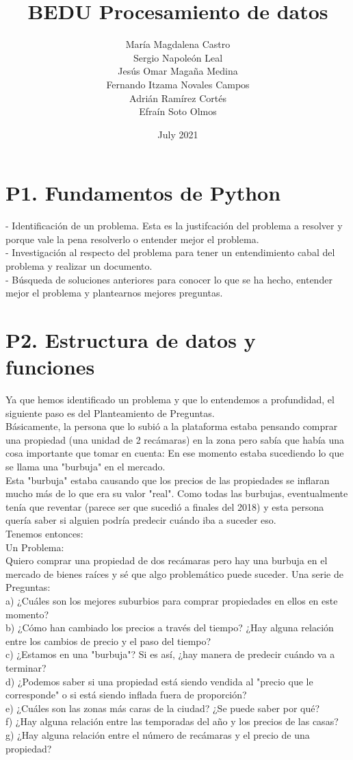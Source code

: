 \documentclass{article}
\title{BEDU Procesamiento de datos}
\author{María  Magdalena Castro\\
Sergio Napoleón Leal\\
Jesús Omar Magaña Medina\\
Fernando Itzama Novales Campos\\
Adrián Ramírez Cortés\\
Efraín Soto Olmos}
\date{July 2021}
\begin{document}
\maketitle
\section{P1. Fundamentos de Python}
- Identificación de un problema. Esta es la justifcación del problema a resolver y porque vale la pena resolverlo o entender mejor el problema.\\
- Investigación al respecto del problema para tener un entendimiento cabal del problema y realizar un documento. \\
- Búsqueda de soluciones anteriores para conocer lo que se ha hecho, entender mejor el problema y plantearnos mejores preguntas. 
\section{P2. Estructura de datos y funciones}
Ya que hemos identificado un problema y que lo entendemos a profundidad, el siguiente paso es del Planteamiento de Preguntas.\\
Básicamente, la persona que lo subió a la plataforma estaba pensando comprar una propiedad (una unidad de 2 recámaras) en la zona pero sabía que había una cosa importante que tomar en cuenta: En ese momento estaba sucediendo lo que se llama una "burbuja" en el mercado.\\
Esta "burbuja" estaba causando que los precios de las propiedades se inflaran mucho más de lo que era su valor "real". Como todas las burbujas, eventualmente tenía que reventar (parece ser que sucedió a finales del 2018) y esta persona quería saber si alguien podría predecir cuándo iba a suceder eso.\\
Tenemos entonces:\\
Un Problema:\\
Quiero comprar una propiedad de dos recámaras pero hay una burbuja en el mercado de bienes raíces y sé que algo problemático puede suceder.
Una serie de Preguntas:\\
a) ¿Cuáles son los mejores suburbios para comprar propiedades en ellos en este momento?\\
b) ¿Cómo han cambiado los precios a través del tiempo? ¿Hay alguna relación entre los cambios de precio y el paso del tiempo?\\
c) ¿Estamos en una "burbuja"? Si es así, ¿hay manera de predecir cuándo va a terminar?\\
d) ¿Podemos saber si una propiedad está siendo vendida al "precio que le corresponde" o si está siendo inflada fuera de proporción?\\
e) ¿Cuáles son las zonas más caras de la ciudad? ¿Se puede saber por qué?\\
f) ¿Hay alguna relación entre las temporadas del año y los precios de las casas?\\
g) ¿Hay alguna relación entre el número de recámaras y el precio de una propiedad?
\end{document}
